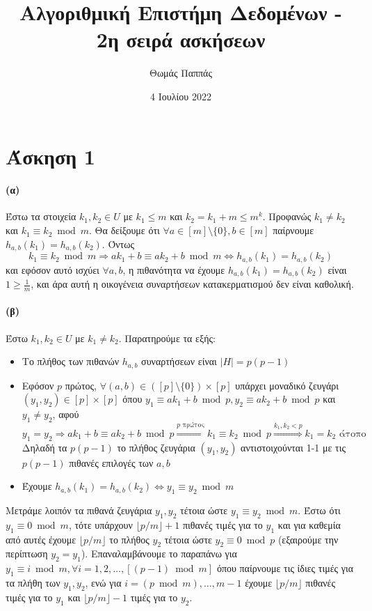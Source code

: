 \documentclass[a4paper,11pt]{article}
\newcommand{\RightarrowArg}[1]{\stackrel{#1}{\Longrightarrow}}
\begin{document}
\title{Αλγοριθμική Επιστήμη Δεδομένων - 2η σειρά ασκήσεων}
\author{Θωμάς Παππάς}
\date{4 Ιουλίου 2022}
\maketitle

\section*{Άσκηση 1}

\paragraph{(α)} Έστω τα στοιχεία $k_1,k_2 \in U$ με $k_1 \leq m$ και $k_2 = k_1+m \leq m^k$.
Προφανώς $k_1 \neq k_2$ και $k_1 \equiv k_2 \bmod m$.
Θα δείξουμε ότι $\forall a \in [m] \setminus \{0\}, b \in [m]$ παίρνουμε $h_{a,b}(k_1) = h_{a,b}(k_2)$.
Όντως
\[k_1 \equiv k_2 \bmod m \Rightarrow ak_1+b \equiv ak_2+b \bmod m \Leftrightarrow h_{a,b}(k_1) = h_{a,b}(k_2)\]
και εφόσον αυτό ισχύει $\forall a, b$, η πιθανότητα να έχουμε $h_{a,b}(k_1) = h_{a,b}(k_2)$ είναι $1 \geq \frac1{m}$, και άρα αυτή η οικογένεια συναρτήσεων κατακερματισμού δεν είναι καθολική.

\paragraph{(β)} Έστω $k_1,k_2 \in U$ με $k_1 \neq k_2$. Παρατηρούμε τα εξής:

\begin{itemize}
	\item Το πλήθος των πιθανών $h_{a,b}$ συναρτήσεων είναι $|H|=p(p-1)$
	\item Εφόσον $p$ πρώτος, $\forall (a,b) \in ([p] \setminus \{0\}) \times [p]$ υπάρχει μοναδικό ζευγάρι $(y_1,y_2) \in [p] \times [p]$ όπου $y_1 \equiv ak_1+b \bmod p, y_2 \equiv ak_2+b \bmod p$ και $y_1 \neq y_2$, αφού
		\[y_1=y_2 \Rightarrow ak_1+b \equiv ak_2+b \bmod p \RightarrowArg{p \text{ πρώτος}} k_1 \equiv k_2 \bmod p \RightarrowArg{k_1,k_2<p} k_1=k_2 \text{ άτοπο}\]
		Δηλαδή τα $p(p-1)$ το πλήθος ζευγάρια $(y_1,y_2)$ αντιστοιχούνται 1-1 με τις $p(p-1)$ πιθανές επιλογές των $a,b$
	\item Έχουμε $h_{a,b}(k_1) = h_{a,b}(k_2) \Leftrightarrow y_1 \equiv y_2 \bmod m$
\end{itemize}
Μετράμε λοιπόν τα πιθανά ζευγάρια $y_1,y_2$ τέτοια ώστε $y_1 \equiv y_2 \bmod m$.
Έστω ότι $y_1 \equiv 0 \bmod m$, τότε υπάρχουν $\lfloor p/m \rfloor + 1$ πιθανές τιμές για το $y_1$ και για καθεμία από αυτές έχουμε $\lfloor p/m \rfloor$ το πλήθος $y_2$ τέτοια ώστε $y_2 \equiv 0 \bmod p$ (εξαιρούμε την περίπτωση $y_2=y_1$).
Επαναλαμβάνουμε το παραπάνω για $y_1 \equiv i \bmod m, \forall i = 1,2,\dots,[(p-1) \bmod m]$ όπου παίρνουμε τις ίδιες τιμές για τα πλήθη των $y_1,y_2$, ενώ για $i=(p \bmod m),\dots,m-1$ έχουμε $\lfloor p/m \rfloor$ πιθανές τιμές για το $y_1$ και $\lfloor p/m \rfloor - 1$ τιμές για το $y_2$.
\end{document}
